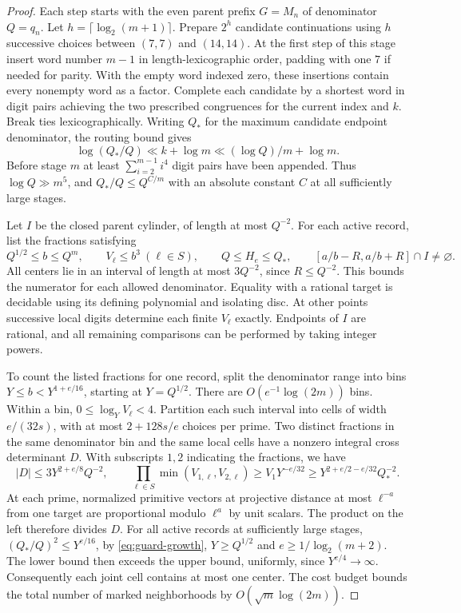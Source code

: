 \documentclass[11pt,a4paper]{article}
\begin{document}
\begin{proof}
Each step starts with the even parent prefix $G=M_n$ of denominator
$Q=q_n$. Let $h=\lceil\log_2(m+1)\rceil$. Prepare $2^h$ candidate
continuations using $h$ successive choices between $(7,7)$ and
$(14,14)$. At the first step of this stage insert word number $m-1$ in length-lexicographic order, padding with one $7$ if needed
for parity. With the empty word indexed zero, these insertions contain
every nonempty word as a factor. Complete each candidate by a
shortest word in digit pairs achieving the two prescribed congruences
for the current index and $k$. Break ties lexicographically.
Writing $Q_*$ for the maximum candidate endpoint denominator, the
routing bound gives
\begin{equation}\label{eq:guard-growth}
 \log(Q_*/Q)\ll k+\log m\ll(\log Q)/m+\log m .
\end{equation}
Before stage $m$ at least $\sum_{i=2}^{m-1}i^4$ digit pairs have been
appended. Thus $\log Q\gg m^5$, and $Q_*/Q\le Q^{C/m}$ with an
absolute constant $C$ at all sufficiently large stages.

Let $I$ be the closed parent cylinder, of length at most $Q^{-2}$.
For each active record, list the fractions satisfying
\[
 Q^{1/2}\le b\le Q^m,\qquad V_\ell\le b^3\ (\ell\in S),\qquad
 Q\le H_e\le Q_*,\qquad
 [a/b-R,a/b+R]\cap I\ne\varnothing .
\]
All centers lie in an interval of length at most $3Q^{-2}$, since
$R\le Q^{-2}$. This bounds the numerator for each allowed denominator.
Equality with a rational target is decidable using its defining
polynomial and isolating disc. At other points successive local
digits determine each finite $V_\ell$ exactly. Endpoints of $I$ are
rational, and all remaining comparisons can be performed by taking
integer powers.

To count the listed fractions for one record, split the denominator
range into bins $Y\le b<Y^{1+e/16}$, starting at $Y=Q^{1/2}$.
There are $O(e^{-1}\log(2m))$ bins. Within a bin,
$0\le\log_Y V_\ell<4$. Partition each such interval into cells of
width $e/(32s)$, with at most $2+128s/e$ choices per prime.
Two distinct fractions in the same denominator bin and the same
local cells have a nonzero integral cross determinant $D$. With
subscripts $1,2$ indicating the fractions, we have
\[
 |D|\le 3Y^{2+e/8}Q^{-2},\qquad
 \prod_{\ell\in S}\min(V_{1,\ell},V_{2,\ell})
 \ge V_1Y^{-e/32}\ge Y^{2+e/2-e/32}Q_*^{-2}.
\]
At each prime, normalized primitive vectors at projective distance
at most $\ell^{-a}$ from one target are proportional modulo
$\ell^a$ by unit scalars. The product on the left therefore divides
$D$. For all active records at sufficiently large stages,
$(Q_*/Q)^2\le Y^{e/16}$, by \eqref{eq:guard-growth},
$Y\ge Q^{1/2}$ and $e\ge1/\log_2(m+2)$. The lower bound then
exceeds the upper bound, uniformly, since $Y^{e/4}\to\infty$.
Consequently each joint cell contains at most one center. The
cost budget bounds the total number of marked neighborhoods by
$O(\sqrt m\log(2m))$.


\end{proof}
\end{document}
